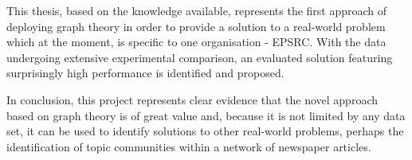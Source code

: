 This thesis, based on the knowledge available, represents the first approach of deploying graph theory in order to provide a solution to a real-world problem which at the moment, is specific to one organisation - EPSRC. With the data undergoing extensive experimental comparison, an evaluated solution featuring surprisingly high performance is identified and proposed.

In conclusion, this project represents clear evidence that the novel approach based on graph theory is of great value and, because it is not limited by any data set, it can be used to identify solutions to other real-world problems, perhaps the identification of topic communities within a network of newspaper articles.